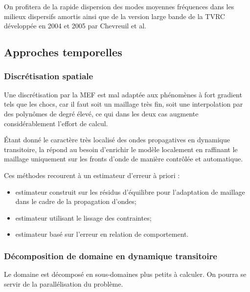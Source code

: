 On profitera de la rapide dispersion des modes moyennes fréquences dans les milieux dispersifs amortis
ainsi que de la version large bande de la TVRC développée en 2004 et 2005 par 
Chevreuil et al.

\medskip
\subsection{Approches temporelles}

\subsubsection{Discrétisation spatiale}
Une discrétisation par la MEF est mal adaptée aux phénomènes à fort gradient tels
que les chocs, car il faut soit un maillage très fin, soit une interpolation par des polynômes
de degré élevé, ce qui dans les deux cas augmente considérablement l'effort de calcul.

Étant donné le caractère très localisé des ondes propagatives en dynamique transitoire,
la  répond au besoin d'enrichir le modèle 
localement en raffinant le maillage uniquement sur les fronts d'onde de manière contrôlée et
automatique.

Ces méthodes recourent à un estimateur d'erreur à priori :
\begin{itemize}
	\item estimateur construit sur les résidus d'équilibre pour l'adaptation de
		maillage dans le cadre de la propagation d'ondes;
	\item estimateur utilisant le lissage des contraintes;
	\item estimateur basé sur l'erreur en relation de comportement.
\end{itemize}

\medskip
\subsubsection{Décomposition de domaine en dynamique transitoire}\label{Sec-Schur}

Le domaine est décomposé en sous-domaines plus petits à calculer.
On pourra se servir de la parallélisation du problème.

